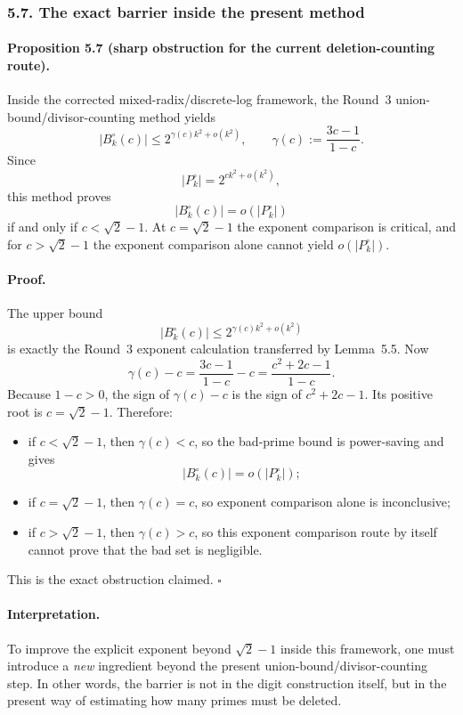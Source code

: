 \subsubsection*{5.7. The exact barrier inside the present method}

\paragraph{Proposition 5.7 (sharp obstruction for the current deletion-counting route).}
Inside the corrected mixed-radix/discrete-log framework, the Round~3 union-bound/divisor-counting method yields
\[
|B_k^{\circ}(c)|\le 2^{\gamma(c)k^2+o(k^2)},
\qquad
\gamma(c):=\frac{3c-1}{1-c}.
\]
Since
\[
|P_k^{\circ}|=2^{ck^2+o(k^2)},
\]
this method proves
\[
|B_k^{\circ}(c)|=o(|P_k^{\circ}|)
\]
if and only if $c<\sqrt2-1$.
At $c=\sqrt2-1$ the exponent comparison is critical, and for $c>\sqrt2-1$ the exponent comparison alone cannot yield $o(|P_k^{\circ}|)$.

\paragraph{Proof.}
The upper bound
\[
|B_k^{\circ}(c)|\le 2^{\gamma(c)k^2+o(k^2)}
\]
is exactly the Round~3 exponent calculation transferred by Lemma~5.5.
Now
\[
\gamma(c)-c
=
\frac{3c-1}{1-c}-c
=
\frac{c^2+2c-1}{1-c}.
\]
Because $1-c>0$, the sign of $\gamma(c)-c$ is the sign of $c^2+2c-1$.
Its positive root is $c=\sqrt2-1$.
Therefore:
\begin{itemize}
\item if $c<\sqrt2-1$, then $\gamma(c)<c$, so the bad-prime bound is power-saving and gives
\[
|B_k^{\circ}(c)|=o(|P_k^{\circ}|);
\]
\item if $c=\sqrt2-1$, then $\gamma(c)=c$, so exponent comparison alone is inconclusive;
\item if $c>\sqrt2-1$, then $\gamma(c)>c$, so this exponent comparison route by itself cannot prove that the bad set is negligible.
\end{itemize}
This is the exact obstruction claimed. \hfill$\square$

\paragraph{Interpretation.}
To improve the explicit exponent beyond $\sqrt2-1$ inside this framework, one must introduce a \emph{new} ingredient beyond the present union-bound/divisor-counting step.
In other words, the barrier is not in the digit construction itself, but in the present way of estimating how many primes must be deleted.


